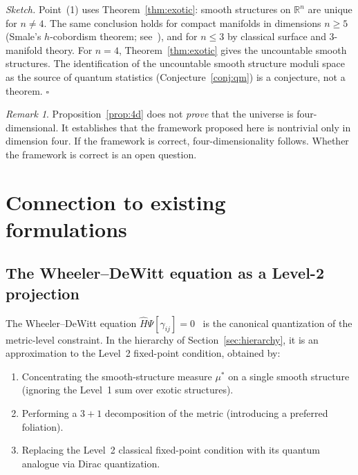 \documentclass[12pt,a4paper]{article}
\theoremstyle{definition}
\theoremstyle{remark}
\newtheorem{remark}{Remark}
\begin{document}
\noindent\emph{Sketch.} Point~(1) uses Theorem~\ref{thm:exotic}: smooth
structures on $\mathbb{R}^n$ are unique for $n \neq 4$. The same
conclusion holds for compact manifolds in dimensions $n \geq 5$ (Smale's
$h$-cobordism theorem; see~\cite{smale}), and for $n \leq 3$ by
classical surface and 3-manifold theory. For $n = 4$,
Theorem~\ref{thm:exotic} gives the uncountable smooth structures.
The identification of the uncountable smooth structure moduli space as
the source of quantum statistics (Conjecture~\ref{conj:qm}) is a
conjecture, not a theorem. \hfill$\square$

\begin{remark}
Proposition~\ref{prop:4d} does not \emph{prove} that the universe is
four-dimensional. It establishes that the framework proposed here is
nontrivial only in dimension four. If the framework is correct,
four-dimensionality follows. Whether the framework is correct is an open
question.
\end{remark}

\section{Connection to existing formulations}
\label{sec:connections}

\subsection{The Wheeler--DeWitt equation as a Level-2 projection}

The Wheeler--DeWitt equation $\hat{H}\Psi[\gamma_{ij}] =
0$~\cite{dewitt} is the canonical quantization of the metric-level
constraint. In the hierarchy of Section~\ref{sec:hierarchy}, it is an
approximation to the Level~2 fixed-point condition, obtained by:

\begin{enumerate}
\item Concentrating the smooth-structure measure $\mu^*$ on a single
smooth structure (ignoring the Level~1 sum over exotic structures).
\item Performing a $3+1$ decomposition of the metric (introducing a
preferred foliation).
\item Replacing the Level~2 classical fixed-point condition with its
quantum analogue via Dirac quantization.
\end{enumerate}
\end{document}
